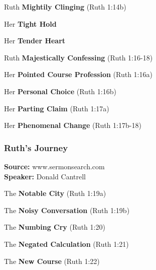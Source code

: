 \begin{compactenum}[I.][7]
    	\begin{compactenum}[A.]
    		\item Ruth \textbf{Mightily Clinging} (Ruth 1:14b)
    		\begin{compactenum}[1.]
    			\item Her \textbf{Tight Hold}
    			\item Her \textbf{Tender Heart}
    		\end{compactenum}
	    	\item Ruth \textbf{Majestically Confessing} (Ruth 1:16-18)
    		\begin{compactenum}[1.]
    			\item Her \textbf{Pointed Course Profession} (Ruth 1:16a)
    			\item Her \textbf{Personal Choice} (Ruth 1:16b)
    			\item Her \textbf{Parting Claim} (Ruth 1:17a)
    			\item Her \textbf{Phenomenal Change} (Ruth 1:17b-18)
    		\end{compactenum}
		\end{compactenum}
\end{compactenum}



\subsubsection{Ruth's Journey}
\textbf{Source: }www.sermonsearch.com\\
\textbf{Speaker: }Donald Cantrell\\
\begin{compactenum}[I.][7]
    \item The \textbf{Notable City} (Ruth 1:19a)
    \item The \textbf{Noisy Conversation} (Ruth 1:19b)
    \item The \textbf{Numbing Cry} (Ruth 1:20)
    \item The \textbf{Negated Calculation} (Ruth 1:21)
    \item The \textbf{New Course} (Ruth 1:22)
\end{compactenum}
